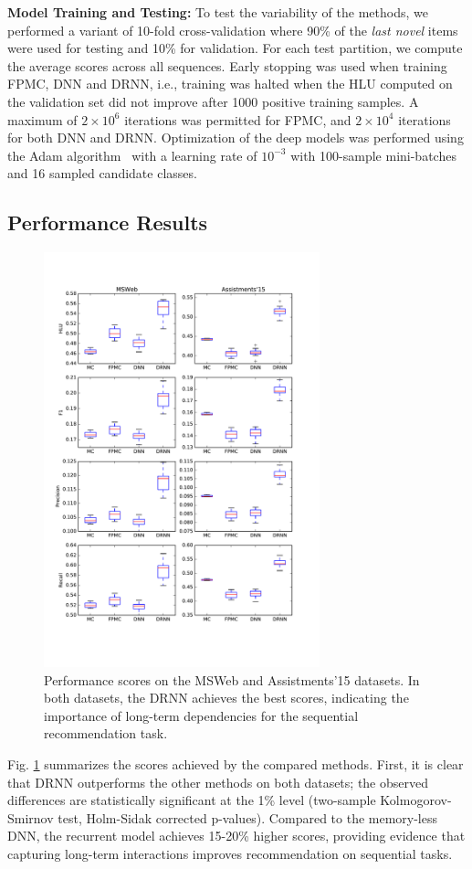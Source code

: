 \documentclass{sig-alternate-05-2015}
\begin{document}
\vspace{2mm}
\noindent\textbf{Model Training and Testing:} To test the variability of the methods, we performed a variant of 10-fold cross-validation where 90\% of the \emph{last novel} items were used for testing and 10\% for validation. For each test partition, we compute the average scores across all sequences. Early stopping was used when training FPMC, DNN and DRNN, i.e., training was halted when the HLU computed on the validation set did not improve after 1000 positive training samples. A maximum of $2\times 10^6$ iterations was permitted for FPMC, and $2\times 10^4$ iterations for both DNN and DRNN. Optimization of the deep models was performed using the Adam algorithm~\cite{Kingma2015} with a learning rate of $10^{-3}$ with 100-sample mini-batches and 16 sampled candidate classes.

\subsection{Performance Results}
\begin{figure}
\includegraphics[width=8cm]{images/PerfBoxplots}		
\caption{Performance scores on the MSWeb and Assistments'15 datasets. In both datasets, the DRNN achieves the best scores, indicating the importance of long-term dependencies for the sequential recommendation task.}
\label{fig:PerfResults}
\end{figure}
Fig. \ref{fig:PerfResults} summarizes the scores achieved by the compared methods. First, it is clear that DRNN outperforms the other methods on both datasets; the observed differences are statistically significant at the 1\% level (two-sample Kolmogorov-Smirnov test, Holm-Sidak corrected p-values). Compared to the memory-less DNN, the recurrent model achieves 15-20\% higher scores, providing evidence that capturing long-term interactions improves recommendation on sequential tasks. 
\end{document}
